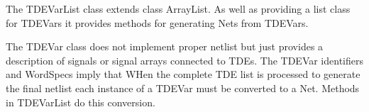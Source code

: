 The TDEVarList class extends class ArrayList. As well as providing a list
class for TDEVars it provides methods for generating Nets from TDEVars.

The TDEVar class does not implement proper netlist but just provides
a description of signals or signal arrays connected to TDEs. The TDEVar
identifiers and WordSpecs imply that 
WHen the complete TDE list is processed to generate the final netlist
each instance of a TDEVar must be converted to a Net. Methods in
TDEVarList do this conversion.
